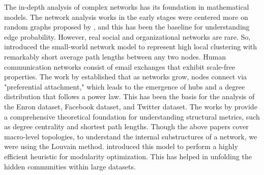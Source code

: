 The in-depth analysis of complex networks has its foundation in mathematical models. The network analysis works in the early stages were centered more on random graphs proposed by \citet{erdos1959}, and this has been the baseline for understanding edge probability. However, real social and organizational networks are rare. So, \citet{watts1998} introduced the small-world network model to represent high local clustering with remarkably short average path lengths between any two nodes.
Human communication networks consist of email exchanges that exhibit scale-free properties. The work by \citet{barabasi1999} established that as networks grow, nodes connect via "preferential attachment," which leads to the emergence of hubs and a degree distribution that follows a power law. This has been the basis for the analysis of the Enron dataset, Facebook dataset, and Twitter dataset. The works by \citet{newman2018networks} provide a comprehensive theoretical foundation for understanding structural metrics, such as degree centrality and shortest path lengths.
Though the above papers cover macro-level topologies, to understand the internal substructures of a network, we were using the Louvain method. \citet{blondel2008} introduced this model to perform a highly efficient heuristic for modularity optimization. This has helped in unfolding the hidden communities within large datasets.
